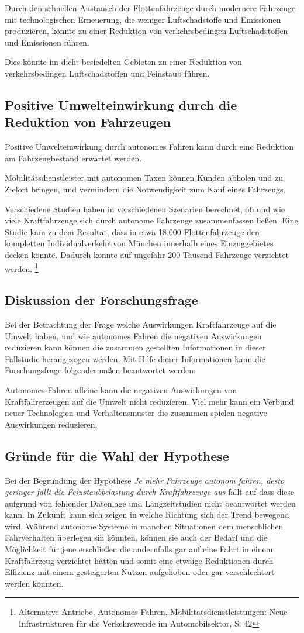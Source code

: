 Durch den schnellen Austausch der Flottenfahrzeuge durch modernere Fahrzeuge mit technologischen Erneuerung,
die weniger Luftschadstoffe und Emissionen produzieren, könnte zu einer Reduktion von verkehrsbedingen Luftschadstoffen und Emissionen führen.

Dies könnte im dicht besiedelten Gebieten zu einer Reduktion von verkehrsbedingen Luftschadstoffen und Feinstaub führen.

\subsection{Positive Umwelteinwirkung durch die Reduktion von Fahrzeugen}
Positive Umwelteinwirkung durch autonomes Fahren kann durch eine
Reduktion am Fahrzeugbestand erwartet werden.

Mobilitätsdienstleister mit autonomen Taxen können
Kunden abholen und zu Zielort bringen,
und vermindern die Notwendigkeit zum Kauf eines Fahrzeugs.

Verschiedene Studien haben in verschiedenen Szenarien berechnet, ob und wie viele Kraftfahrzeuge sich durch autonome Fahrzeuge zusammenfassen ließen.
Eine Studie kam zu dem Resultat, dass in etwa 18.000 Flottenfahrzeuge den kompletten Individualverkehr von München innerhalb eines Einzuggebietes decken könnte.
Dadurch könnte auf ungefähr 200 Tausend Fahrzeuge verzichtet werden.
\footnote{Alternative Antriebe, Autonomes Fahren,
	Mobilitätsdienstleistungen: Neue Infrastrukturen für
	die Verkehrswende im Automobilsektor, S. 42}

\subsection{Diskussion der Forschungsfrage}
Bei der Betrachtung der Frage welche Auswirkungen Kraftfahrzeuge auf die Umwelt haben, und wie autonomes Fahren die negativen Auswirkungen reduzieren kann
können die zusammen gestellten Informationen in dieser Fallstudie herangezogen werden.
Mit Hilfe dieser Informationen kann die Forschungsfrage folgendermaßen beantwortet werden:

Autonomes Fahren alleine kann die negativen Auswirkungen von Kraftfahrerzeugen auf die Umwelt nicht reduzieren.
Viel mehr kann ein Verbund neuer Technologien und Verhaltensmuster die zusammen spielen negative Auswirkungen reduzieren.

\subsection{Gründe für die Wahl der Hypothese}
Bei der Begründung der Hypothese \textit{Je mehr Fahrzeuge
	autonom fahren, desto geringer fällt die Feinstaubbelastung durch Kraftfahrzeuge aus}
fällt auf dass diese aufgrund von fehlender Datenlage und Langzeitstudien nicht beantwortet werden kann.
In Zukunft kann sich zeigen in welche Richtung sich der Trend bewegend wird.
Während autonome Systeme in manchen Situationen dem menschlichen Fahrverhalten überlegen sin könnten,
können sie auch der Bedarf und die Möglichkeit für jene erschließen die andernfalls gar auf eine Fahrt in einem Kraftfahrzeug
verzichtet hätten und somit eine etwaige Reduktionen durch Effizienz mit einem gesteigerten Nutzen aufgehoben oder gar verschlechtert werden könnten.
